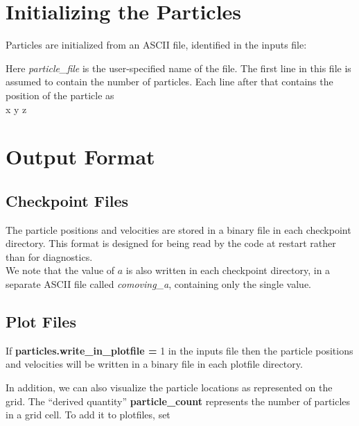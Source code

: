 
\section{Initializing the Particles}

Particles are initialized from an ASCII file, identified in the \iamr inputs file:


Here {\em particle\_file} is the user-specified name of the file.  The first line in this file is
assumed to contain the number of particles.  Each line after that contains the position of the particle as \\

x y z  \\

\section{Output Format}

\subsection{Checkpoint Files}

The particle positions and velocities are stored in a binary file in each checkpoint directory.  
This format is designed for being read by the code at restart rather than for diagnostics. \\

We note that the value of $a$ is also written in each checkpoint directory, 
in a separate ASCII file called {\em comoving\_a}, containing only the single value. \\

\subsection{Plot Files}

If {\bf particles.write\_in\_plotfile =} 1 in the inputs file 
then the particle positions and velocities will be written in a binary file in each plotfile directory.  

In addition, we can also
visualize the particle locations as represented on the grid.  The ``derived quantity''
{\bf particle\_count} represents the number of particles in a grid cell.
To add it to plotfiles, set \\

 \\

